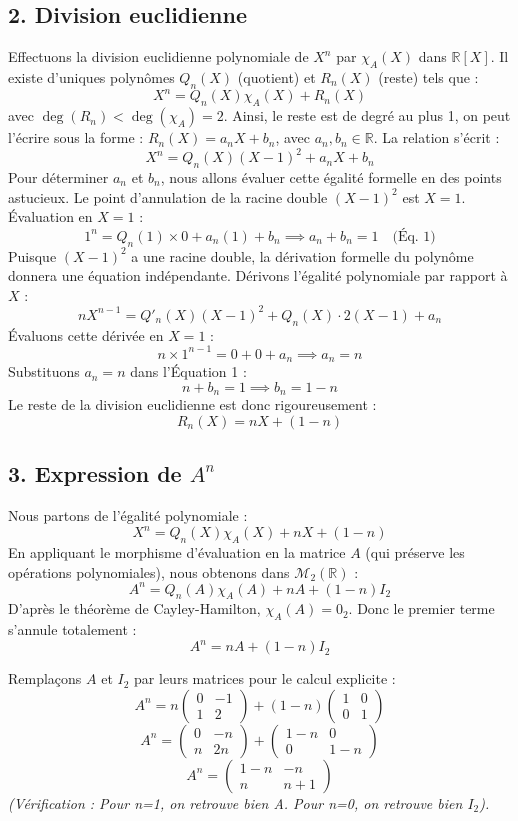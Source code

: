 \documentclass[11pt,a4paper]{article}
\begin{document}
\subsection{2. Division euclidienne}
Effectuons la division euclidienne polynomiale de $X^n$ par $\chi_A(X)$ dans $\mathbb{R}[X]$. Il existe d'uniques polynômes $Q_n(X)$ (quotient) et $R_n(X)$ (reste) tels que :
$$X^n = Q_n(X) \chi_A(X) + R_n(X)$$
avec $\deg(R_n) < \deg(\chi_A) = 2$.
Ainsi, le reste est de degré au plus 1, on peut l'écrire sous la forme : $R_n(X) = a_n X + b_n$, avec $a_n, b_n \in \mathbb{R}$.
La relation s'écrit :
$$X^n = Q_n(X)(X - 1)^2 + a_n X + b_n$$
Pour déterminer $a_n$ et $b_n$, nous allons évaluer cette égalité formelle en des points astucieux. Le point d'annulation de la racine double $(X-1)^2$ est $X=1$.
Évaluation en $X=1$ :
$$1^n = Q_n(1) \times 0 + a_n(1) + b_n \implies a_n + b_n = 1 \quad \text{(Éq. 1)}$$
Puisque $(X-1)^2$ a une racine double, la dérivation formelle du polynôme donnera une équation indépendante. Dérivons l'égalité polynomiale par rapport à $X$ :
$$n X^{n-1} = Q'_n(X)(X-1)^2 + Q_n(X) \cdot 2(X-1) + a_n$$
Évaluons cette dérivée en $X=1$ :
$$n \times 1^{n-1} = 0 + 0 + a_n \implies a_n = n$$
Substituons $a_n = n$ dans l'Équation 1 :
$$n + b_n = 1 \implies b_n = 1 - n$$
Le reste de la division euclidienne est donc rigoureusement :
$$R_n(X) = nX + (1 - n)$$

\subsection{3. Expression de $A^n$}
Nous partons de l'égalité polynomiale :
$$X^n = Q_n(X)\chi_A(X) + nX + (1 - n)$$
En appliquant le morphisme d'évaluation en la matrice $A$ (qui préserve les opérations polynomiales), nous obtenons dans $\mathcal{M}_2(\mathbb{R})$ :
$$A^n = Q_n(A)\chi_A(A) + nA + (1 - n)I_2$$
D'après le théorème de Cayley-Hamilton, $\chi_A(A) = 0_2$. Donc le premier terme s'annule totalement :
$$A^n = nA + (1 - n)I_2$$

Remplaçons $A$ et $I_2$ par leurs matrices pour le calcul explicite :
$$A^n = n \begin{pmatrix} 0 & -1 \\ 1 & 2 \end{pmatrix} + (1 - n) \begin{pmatrix} 1 & 0 \\ 0 & 1 \end{pmatrix}$$
$$A^n = \begin{pmatrix} 0 & -n \\ n & 2n \end{pmatrix} + \begin{pmatrix} 1 - n & 0 \\ 0 & 1 - n \end{pmatrix}$$
$$A^n = \begin{pmatrix} 1 - n & -n \\ n & n + 1 \end{pmatrix}$$
\textit{(Vérification : Pour n=1, on retrouve bien A. Pour n=0, on retrouve bien $I_2$).}
\end{document}
